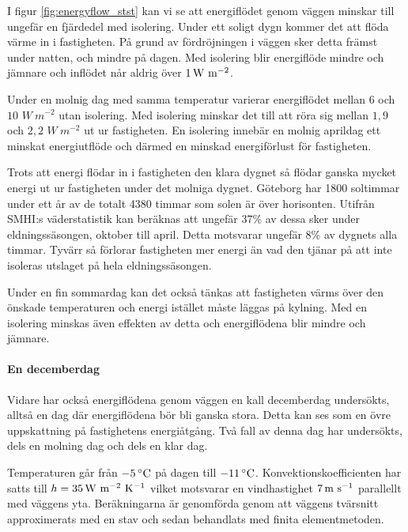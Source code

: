 I figur \ref{fig:energyflow_stst} kan vi se att energiflödet genom väggen minskar till 
ungefär en fjärdedel med isolering. Under ett soligt dygn kommer det att flöda värme in i
 fastigheten. På grund av fördröjningen i väggen sker detta främst under natten, 
 och mindre på dagen. Med isolering blir energiflöde mindre och jämnare och inflödet når aldrig över $\unit[1]{W~m^{-2}}$.

Under en molnig dag med samma temperatur varierar energiflödet mellan $6$ och $10$ 
$\unit{W~m^{-2}}$ utan isolering. Med isolering minskar det till att röra sig mellan $1,9$ och $2,2$ $\unit{W~m^{-2}}$ ut ur 
fastigheten. En isolering innebär en molnig aprildag ett minskat energiutflöde och därmed en minskad 
energiförlust för fastigheten.

Trots att energi flödar in i fastigheten den klara dygnet så flödar ganska mycket energi 
ut ur fastigheten under det molniga dygnet. Göteborg har 1800 soltimmar under ett
 år av de totalt 4380 timmar som solen är över horisonten. Utifrån SMHI:s väderstatistik \cite{SMHIdata}
 kan beräknas att ungefär 37\% av dessa sker under eldningssäsongen, oktober till april. 
 Detta motsvarar ungefär 8\% av dygnets alla timmar. Tyvärr så förlorar fastigheten mer 
 energi än vad den tjänar på att inte isoleras utslaget på hela eldningssäsongen.

Under en fin sommardag kan det också tänkas att fastigheten värms över den önskade 
temperaturen och energi istället måste läggas på kylning. Med en isolering minskas även 
effekten av detta och energiflödena blir mindre och jämnare.

\paragraph{En decemberdag}

Vidare har också energiflödena genom väggen en kall decemberdag undersökts, 
alltså en dag där energiflödena bör bli ganska stora. Detta kan ses som en övre uppskattning på fastighetens energiåtgång. Två fall av
denna dag har undersökts, dels en molning dag och dels en klar dag.

 Temperaturen går från $\unit[-5]{^\circ C}$ på dagen till $\unit[-11]{^\circ C}$. 
 Konvektionskoefficienten har satts till $h=\unit[35]{W~m^{-2}~K^{-1}}$ 
 vilket motsvarar en vindhastighet $\unit[7]{m~s^{-1}}$ parallellt med väggens yta. 
 Beräkningarna är genomförda genom att väggens tvärsnitt approximerats med en stav och sedan behandlats med finita elementmetoden.



